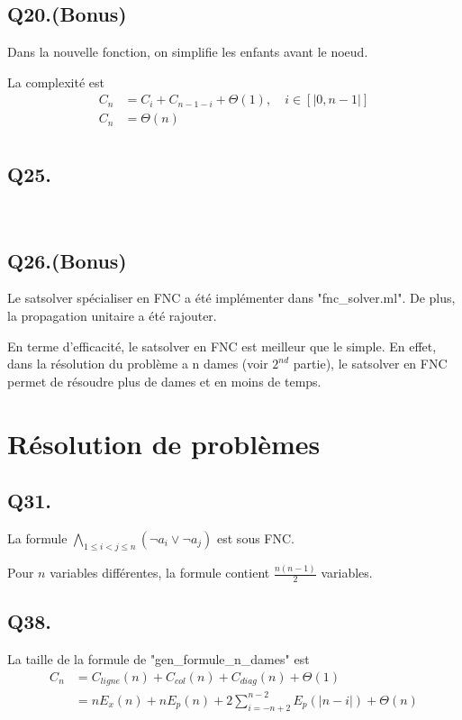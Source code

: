     \subsection*{Q20.(Bonus)}
    Dans la nouvelle fonction, on simplifie les enfants avant le noeud.
    
    La complexité est
    \begin{align*}
        C_n &= C_{i} + C_{n-1-i} + \Theta(1), \quad i \in [|0, n-1|]\\
        C_n &= \boxed{\Theta(n)}\\
    \end{align*}
    
    \subsection*{Q25.}~
    
    \subsection*{Q26.(Bonus)}
    Le satsolver spécialiser en FNC a été implémenter dans "fnc\_solver.ml".
    De plus, la propagation unitaire a été rajouter.
    
    En terme d'efficacité, le satsolver en FNC est meilleur que le simple.
    En effet, dans la résolution du problème a n dames (voir $2^{nd}$ partie),
    le satsolver en FNC permet de résoudre plus de dames et en moins de temps.
    
    \section{Résolution de problèmes}
    \subsection*{Q31.}
    La formule
    $\boxed{\bigwedge\limits_{1 \leq i < j \leq n}\left(\lnot a_i \lor \lnot a_j\right)}$
    est sous FNC.
    
    Pour $n$ variables différentes, la formule contient $\frac{n(n-1)}{2}$ variables.
    
    \subsection*{Q38.}
    La taille de la formule de "gen\_formule\_n\_dames" est
    \begin{align*}
        C_n &= C_{ligne}(n) + C_{col}(n) + C_{diag}(n) + \Theta(1)\\
        &= nE_x(n) + nE_p(n) + 2\sum_{i=-n+2}^{n-2}E_p(|n-i|) + \Theta(n)\\
    \end{align*}
    

